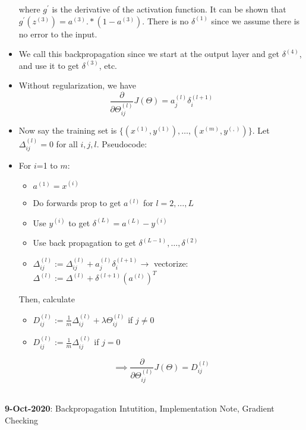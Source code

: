 \documentclass[10pt]{article}
\begin{document}
\begin{itemize}
\begin{equation*}
    \end{equation*}
    where $g^{\prime}$ is the derivative of the activation function. It can be shown that $g^{\prime}(z^{(3)}) = a^{(3)}.*\left(1-a^{(3)}\right)$. There is no $\delta^{(1)}$ since we assume there is no error to the input.
  \item We call this backpropagation since we start at the output layer and get $\delta^{(4)}$, and use it to get $\delta^{(3)}$, etc.
  \item Without regularization, we have 
    \begin{equation*}
      \frac{ \partial }{\partial \Theta_{ij}^{(l)}} J (\Theta) = a_j^{(l)} \delta_i^{(l+1)}
    \end{equation*}
  \item Now say the training set is $\{ (x^{(1)}, y^{(1)}), \dots, (x^{(m)}, y^{(,)})\}$. Let $\Delta_{ij}^{(l)}=0$ for all $i,j,l$. Pseudocode:
  \item For $i$=1 to $m$:
    \begin{itemize}
      \item  $a^{(1)} = x^{(i)}$
      \item Do forwards prop to get $a^{(l)}$ for $l=2,\dots,L$
      \item Use $y^{(i)}$ to get $\delta^{(L)} = a^{(L)} - y^{(i)}$
      \item Use back propagation to get $\delta^{(L-1)},\dots,\delta^{(2)}$
      \item $\Delta_{ij}^{(l)} := \Delta_{ij}^{(l)} + a_j^{(l)}\delta_i^{(l+1)} \rightarrow$ vectorize: $\Delta^{(l)} := \Delta^{(l)} + \delta^{(l+1)}(a^{(l)})^T$
    \end{itemize}
    Then, calculate
    \begin{itemize}
      \item $D_{ij}^{(l)} := \frac{1}{m} \Delta_{ij}^{(l)} + \lambda \Theta_{ij}^{(l)}$ if $j \neq 0$
      \item $D_{ij}^{(l)} := \frac{1}{m} \Delta_{ij}^{(l)}$ if $j =0$
    \end{itemize}
    \begin{equation*}
      \implies \frac{\partial}{\partial \Theta_{ij}^{(l)}} J( \Theta ) = D_{ij}^{(l)}
    \end{equation*}
\end{itemize}
\hfill \\
{\large \textbf{9-Oct-2020}: Backpropagation Intutition, Implementation Note, Gradient Checking}
\end{document}
